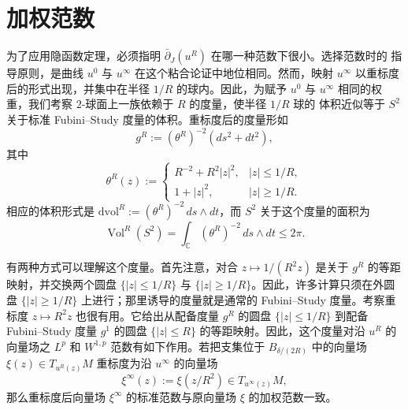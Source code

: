 
\section{加权范数}\label{sec:10-3}

为了应用隐函数定理，必须指明 $\bar\partial_J(u^R)$ 在哪一种范数下很小。选择范数时的
指导原则，是曲线 $u^0$ 与 $u^\infty$ 在这个粘合论证中地位相同。然而，映射
$u^\infty$ 以重标度后的形式出现，并集中在半径 $1/R$ 的球内。因此，为赋予 $u^0$ 与
$u^\infty$ 相同的权重，我们考察 $2$-球面上一族依赖于 $R$ 的度量，使半径 $1/R$ 球的
体积近似等于 $S^2$ 关于标准 Fubini--Study 度量的体积。重标度后的度量形如
\begin{equation}\label{eq:10-3-1}
  g^R:=(\theta^R)^{-2}(ds^2+dt^2),
\end{equation}
其中
\[
  \theta^R(z):=
  \begin{cases}
    R^{-2}+R^2|z|^2,& |z|\le1/R,\\
    1+|z|^2,& |z|\ge1/R.
  \end{cases}
\]
相应的体积形式是
$\mathrm{dvol}^R:=(\theta^R)^{-2}\,ds\wedge dt$，而 $S^2$ 关于这个度量的面积为
\begin{equation}\label{eq:10-3-2}
  \operatorname{Vol}^R(S^2)
  =\int_{\mathbb C}(\theta^R)^{-2}\,ds\wedge dt
  \le2\pi.
\end{equation}

有两种方式可以理解这个度量。首先注意，对合
$z\mapsto1/(R^2z)$ 是关于 $g^R$ 的等距映射，并交换两个圆盘
$\{|z|\le1/R\}$ 与 $\{|z|\ge1/R\}$。因此，许多计算只须在外圆盘
$\{|z|\ge1/R\}$ 上进行；那里诱导的度量就是通常的 Fubini--Study 度量。考察重标度
$z\mapsto R^2z$ 也很有用。它给出从配备度量 $g^R$ 的圆盘 $\{|z|\le1/R\}$ 到配备
Fubini--Study 度量 $g^1$ 的圆盘 $\{|z|\le R\}$ 的等距映射。因此，这个度量对沿
$u^R$ 的向量场之 $L^p$ 和 $W^{1,p}$ 范数有如下作用。若把支集位于
$B_{\delta/(2R)}$ 中的向量场 $\xi(z)\in T_{u^R(z)}M$ 重标度为沿 $u^\infty$ 的向量场
\[
  \xi^\infty(z):=\xi(z/R^2)\in T_{u^\infty(z)}M,
\]
那么重标度后向量场 $\xi^\infty$ 的标准范数与原向量场 $\xi$ 的加权范数一致。

